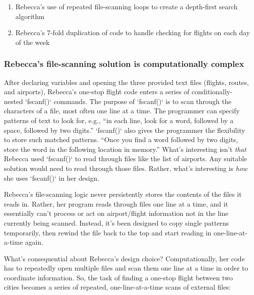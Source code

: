 \begin{enumerate}
\def\labelenumi{\arabic{enumi}.}
\item
  Rebecca's use of repeated file-scanning loops to create a depth-first
  search algorithm
\item
  Rebecca's 7-fold duplication of code to handle checking for flights on
  each day of the week
\end{enumerate}

\subsubsection{Rebecca's file-scanning solution is computationally
complex}\label{rebeccas-file-scanning-solution-is-computationally-complex}

After declaring variables and opening the three provided text files
(flights, routes, and airports), Rebecca's one-stop flight code enters a
series of conditionally-nested `fscanf()` commands. The purpose of
`fscanf()` is to scan through the characters of a file, most often one
line at a time. The programmer can specify patterns of text to look for,
e.g., ``in each line, look for a word, followed by a space, followed by
two digits.'' `fscanf()` also gives the programmer the flexibility to
store such matched patterns. ``Once you find a word followed by two
digits, store the word in the following location in memory.'' What's
interesting isn't \emph{that} Rebecca used `fscanf()` to read through
files like the list of airports. Any suitable solution would need to
read through those files. Rather, what's interesting is \emph{how} she
uses `fscanf()` in her design.

Rebecca's file-scanning logic never persistently stores the contents of
the files it reads in. Rather, her program reads through files one line
at a time, and it essentially can't process or act on airport/flight
information not in the line currently being scanned. Instead, it's been
designed to copy single patterns temporarily, then rewind the file back
to the top and s\protect\hypertarget{GoBack}{}{}tart reading in
one-line-at-a-time again.

What's consequential about Rebecca's design choice? Computationally, her
code has to repeatedly open multiple files and scan them one line at a
time in order to coordinate information. So, the task of finding a
one-stop flight between two cities becomes a series of repeated,
one-line-at-a-time scans of external files:

